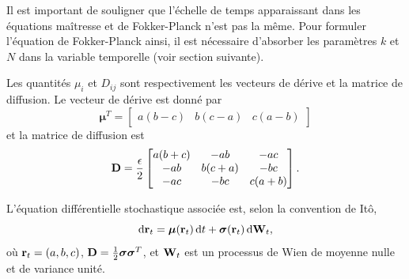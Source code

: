 \documentclass[openany,a4paper,12pt]{article}
\begin{document}
\par Il est important de souligner que l'échelle de temps apparaissant dans les équations maîtresse et de Fokker-Planck n'est pas la même. Pour formuler l'équation de Fokker-Planck ainsi, il est nécessaire d'absorber les paramètres $k$ et $N$ dans la variable temporelle (voir section suivante). 

\par Les quantités $\mu_i$ et $D_{ij}$ sont respectivement les vecteurs de dérive et la matrice de diffusion. Le vecteur de dérive est donné par 
%
\begin{equation}\label{mu_i_expr}
	\boldsymbol\mu^T = 
	\begin{bmatrix} a(b-c) & b(c-a) & c(a-b) \end{bmatrix}
\end{equation}
%
et la matrice de diffusion est
%
\begin{equation}\label{D_ij_expr}
	\bold D = \frac{\epsilon}{2}
	\begin{bmatrix}
	a(b+c) & -ab & -ac \\
	-ab & b(c+a) & -bc \\
	-ac & -bc & c(a+b)
	\end{bmatrix}.
\end{equation}
%

\par L'équation différentielle stochastique associée est, selon la convention de Itô,
%
\begin{equation}\label{SDE_abc}
	\dd \bold r_t = \boldsymbol \mu (\bold r_t) \, \dd t + \boldsymbol \sigma(\bold r_t) \, \dd \bold W_t,
\end{equation}
où $\bold r_t = (a,b,c)$, $\bold D = \frac 12 \boldsymbol \sigma \boldsymbol \sigma^T$, et $\bold W_t$ est un processus de Wien de moyenne nulle et de variance unité.
\end{document}
